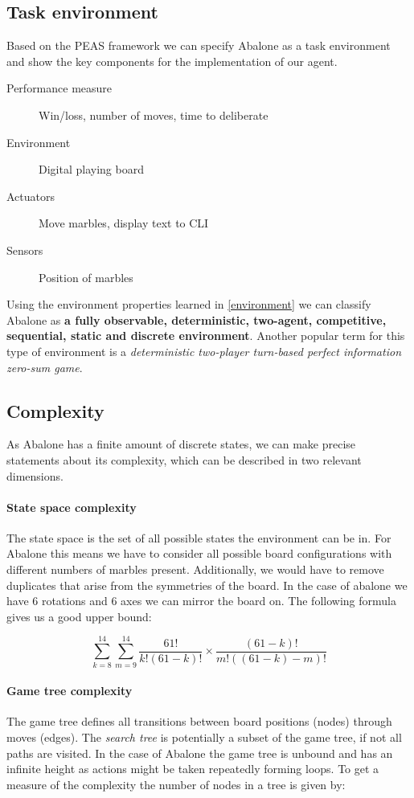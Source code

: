 \subsection{Task environment}
Based on the PEAS framework we can specify Abalone as a task environment and show the key components for the implementation of our agent. \cite[p.107]{russell_artificial_2021}

\begin{description}
    \item[Performance measure] Win/loss, number of moves, time to deliberate
    \item[Environment] Digital playing board
    \item[Actuators] Move marbles, display text to CLI
    \item[Sensors] Position of marbles
\end{description}

Using the environment properties learned in \ref{environment} we can classify Abalone as \textbf{a fully observable, deterministic, two-agent, competitive, sequential, static and discrete environment}. Another popular term for this type of environment is a \textit{deterministic two-player  turn-based perfect information zero-sum game}.

\subsection{Complexity}
As Abalone has a finite amount of discrete states, we can make precise statements about its complexity, which can be described in two relevant dimensions.

\paragraph{State space complexity}
The state space is the set of all possible states the environment can be in.\cite[p. 150]{russell_artificial_2021} For Abalone this means we have to consider all possible board configurations with different numbers of marbles present. Additionally, we would have to remove duplicates that arise from the symmetries of the board. In the case of abalone we have 6 rotations and 6 axes we can mirror the board on. The following formula gives us a good upper bound:

$$
    \sum_{k=8}^{14}\sum_{m=9}^{14}\frac{61!}{k!(61-k)!}\times\frac{(61-k)!}{m!((61-k)-m)!}
$$

\paragraph{Game tree complexity} The game tree defines all transitions between board positions (nodes) through moves (edges). The \textit{search tree} is potentially a subset of the game tree, if not all paths are visited. In the case of Abalone the game tree is unbound and has an infinite height as actions might be taken repeatedly forming loops. To get a measure of the complexity the number of nodes in a tree is given by:

